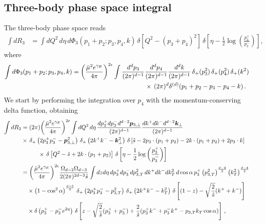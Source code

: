 \documentclass[11pt]{article}
\newcommand{\nn}{\nonumber}
\newcommand{\eps}{\epsilon}
\begin{document}
\subsection{Three-body phase space integral}\label{PSintegral3}
The three-body phase space reads 
\begin{align}\label{R3Def} 
\int dR_3 &= \int dQ^2\, d\eta \, d\Phi_3(p_1+p_2; p_3,p_4,k) 
\, \delta\left[Q^2-(p_3+p_4)^2\right] \, \delta\left[\eta
-\frac12\log\left(\frac{p_3^+}{p_3^-}\right)\right],
\end{align}
where 
\begin{align} \nn
\int d\Phi_3(p_1+p_2; p_3,p_4,k) &= 
\bigg(\frac{\bar \mu^2 e^{\gamma_E}}{4\pi}\bigg)^{2\eps} 
\int \frac{d^dp_3}{(2\pi)^{d-1}} \frac{d^dp_4}{(2\pi)^{d-1}}
\frac{d^dk}{(2\pi)^{d-1}}\,\delta_+(p_3^2) \, \delta_+(p_4^2) 
\, \delta_+(k^2) \\ 
&\hspace{4.0cm}\times \, 
(2\pi)^d\delta^{(d)}(p_1+p_2-p_3-p_4-k)\,.
\end{align}
We start by performing the integration over 
$p_4$ with the momentum-conserving delta function,
obtaining
\begin{align}
\int dR_3 &= (2\pi) \bigg(\frac{\bar \mu^2 e^{\gamma_E}}{4\pi}\bigg)^{2\eps} 
\int dQ^2 \,d\eta\, \frac{dp_3^+dp_3^-d^{d-2}\bm{p}_{3,\perp}}{(2\pi)^{d-1}} 
\frac{dk^+dk^-d^{d-2}\bm{k}_\perp}{(2\pi)^{d-1}} \nonumber \\
&\hspace{0.0cm} \times 
\,\delta_+\left(2p_3^+p_3^--\bm{p}_{3,\perp}^2\right) 
\, \delta_+\left(2k^+k^--\bm{k}_\perp^2\right) 
\, \delta\left[\hat{s}-2p_3\cdot(p_1+p_2)-
2k\cdot(p_1+p_2)+2p_3\cdot k\right] \nonumber \\
&\hspace{1.0cm} \times 
\, \delta\left[Q^2-\hat{s}+2k\cdot(p_1+p_2)\right] \,
\delta\left[\eta-\frac12\log\left(\frac{p_3^+}{p_3^-}\right)\right]
\nonumber \\
&= \bigg(\frac{\bar \mu^2 e^{\gamma_E}}{4\pi}\bigg)^{2\eps}
\frac{\Omega_{d-2}\Omega_{d-3}}{2(2\pi)^{2d-3}\hat{s}}
\int dz d\eta \, dp_3^+dp_3^-dp^2_{3,T}\,
dk^+dk^-dk^2_T\, d\cos\alpha\, p_3^+ 
\left(p^2_{3,T}\right)^{\frac{d-4}{2}}
\left(k^2_T\right)^{\frac{d-4}{2}} \nonumber \\
&\quad\times 
\left(1-\cos^2\alpha\right)^{\frac{d-5}{2}} \,
\delta_+\left(2p_3^+p_3^--p_{3,T}^2\right) \, 
\delta_+\left(2k^+k^--k_T^2\right) \, 
\delta\left[(1-z)-\sqrt{\frac{2}{\hat{s}}}(k^++k^-)\right] \nonumber \\
&\quad\times 
\delta\left(p_3^+-p_3^-e^{2\eta}\right) \, 
\delta\left[z-\sqrt{\frac{2}{\hat{s}}}(p_3^++p_3^-)
+\frac{2}{\hat{s}}(p_3^+k^-+p_3^-k^
+-p_{3,T}k_T\cos\alpha)\right] \,,
\end{align}
\end{document}
